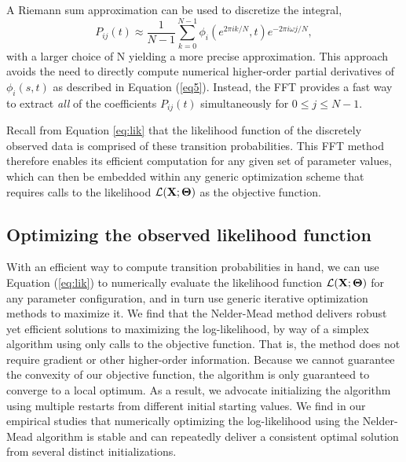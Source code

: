 \documentclass{article}
\newcommand{\achal}[1]{{\color{black}{ #1}}}
\begin{document}
A Riemann sum approximation can be used to discretize the integral,
\begin{equation}
    P_{ij}(t) \approx \frac{1}{N-1}\sum_{k=0}^{N-1}  \phi_{i}(e^{2\pi i k/N},t)e^{-2\pi i\omega j/N},
    \label{eq:rsum}
\end{equation}
with a larger choice of N yielding a more precise approximation. This approach avoids the need to directly compute numerical higher-order partial derivatives of $\phi_{i}(s,t)$ as described in Equation (\ref{eq5}). Instead, the FFT provides a fast way to extract \textit{all} of the coefficients $P_{ij}(t)$  simultaneously for $ 0 \leq j \leq N-1$. \par

Recall from Equation \eqref{eq:lik} that the likelihood function of the discretely observed data is comprised of these transition probabilities. This FFT method therefore enables its efficient computation for any given set of parameter values, which can then be embedded within any generic optimization scheme that requires calls to the likelihood $\mathcal{L(\achal{\mathbf{X}};\mathbf{\Theta})}$ as the objective function. 

\subsection{Optimizing the observed likelihood function} 
\label{Optimizing the observed likelihood function}
 
With an efficient way to compute transition probabilities in hand, we can use Equation (\ref{eq:lik}) to numerically evaluate the  likelihood function $\mathcal{L(\achal{\mathbf{X}};\mathbf{\Theta})}$ for any  parameter configuration, and in turn use generic iterative optimization methods to maximize it.\cite{xu2015likelihood} We find that the Nelder-Mead method \cite{NeldMead65} delivers robust yet efficient solutions to maximizing the log-likelihood, by way of a simplex algorithm using only calls to the objective function. That is, the method does not require gradient or other higher-order information.\cite{nocedal2006numerical} Because we cannot guarantee the convexity of our objective function, the algorithm is only guaranteed to converge to a local optimum.\cite{nocedal2006numerical} As a result, we advocate initializing the algorithm using multiple restarts from different initial starting values. \cite{kochenderfer2019algorithms} We find in our empirical studies that numerically optimizing the log-likelihood using the Nelder-Mead algorithm is stable and can repeatedly deliver a consistent optimal solution from several distinct initializations. \par
\end{document}
